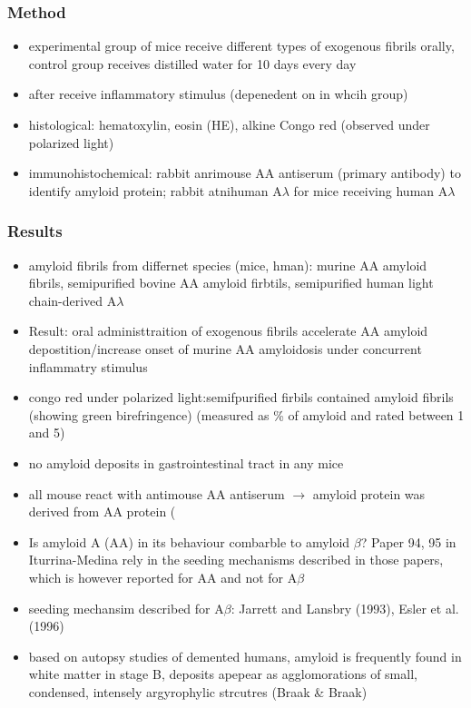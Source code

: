 \documentclass[fleqn]{article}\usepackage{caption}
\begin{document}
\subsubsection{Method}
\begin{itemize}
\item experimental group of mice receive different types of exogenous fibrils orally, control group receives distilled water for 10 days every day
\item after receive inflammatory stimulus (depenedent on in whcih group)
\item histological: hematoxylin, eosin (HE), alkine Congo red (observed under polarized light)
\item immunohistochemical: rabbit anrimouse AA antiserum (primary antibody) to identify amyloid protein; rabbit atnihuman A$\lambda$ for mice receiving human A$\lambda$ 
\end{itemize}

\subsubsection{Results}
\begin{itemize}
\item amyloid fibrils from differnet species (mice, hman): murine AA amyloid fibrils, semipurified bovine AA amyloid firbtils, semipurified human light chain-derived A$\lambda$
\item Result: oral administtraition of exogenous fibrils accelerate AA amyloid depostition/increase onset of murine AA amyloidosis under concurrent inflammatry stimulus
\item congo red under polarized light:semifpurified firbils contained amyloid fibrils (showing green birefringence) (measured as \% of amyloid and rated between 1 and 5)
\item no amyloid deposits in gastrointestinal tract in any mice
\item all mouse react with antimouse AA antiserum $\rightarrow$ amyloid protein was derived from AA protein (
\end{itemize}

\begin{itemize}
\item Is amyloid A (AA) in its behaviour combarble to amyloid $\beta$? Paper 94, 95 in Iturrina-Medina rely in the seeding mechanisms described in those papers, which is however reported for AA and not for A$\beta$
\item seeding mechansim described for A$\beta$: Jarrett and Lansbry (1993), Esler et al. (1996)
\item based on autopsy studies of demented humans, amyloid is frequently found in white matter in stage B, deposits apepear as agglomorations of small, condensed, intensely argyrophylic strcutres (Braak \& Braak) %

\end{itemize}
\end{document}
